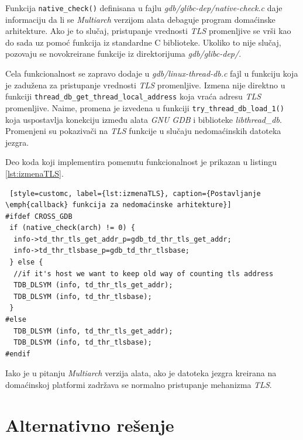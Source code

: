 \documentclass[12pt,oneside]{memoir}
\begin{document}
Funkcija \texttt{native\_check()} definisana u fajlu \emph{gdb/glibc-dep/native-check.c} daje informaciju da li se \emph{Multiarch} verzijom alata debaguje program domaćinske arhitekture. Ako je to slučaj, pristupanje vrednosti \emph{TLS} promenljive se vrši kao do sada uz pomoć funkcija iz standardne C biblioteke. Ukoliko to nije slučaj, pozovaju se novokreirane funkcije iz direktorijuma \emph{gdb/glibc-dep/}.

Cela funkcionalnost se zapravo dodaje u \emph{gdb/linux-thread-db.c} fajl u funkciju koja je zadužena za pristupanje vrednosti \emph{TLS} promenljive. Izmena nije direktno u funkciji \texttt{thread\_db\_get\_thread\_local\_address} koja vraća adresu \emph{TLS} promenljive. Naime, promena je izvedena u funkciji \texttt{try\_thread\_db\_load\_1()} koja uspostavlja konekciju između alata \emph{GNU GDB} i biblioteke \emph{libthread\_db}. Promenjeni su pokazivači na \emph{TLS} funkcije u slučaju nedomaćinskih datoteka jezgra.

Deo koda koji implementira pomenutu funkcionalnost je prikazan u listingu \ref{lst:izmenaTLS}.
\begin{lstlisting} [style=customc, label={lst:izmenaTLS}, caption={Postavljanje \emph{callback} funkcija za nedomaćinske arhitekture}]
#ifdef CROSS_GDB
 if (native_check(arch) != 0) {
  info->td_thr_tls_get_addr_p=gdb_td_thr_tls_get_addr;
  info->td_thr_tlsbase_p=gdb_td_thr_tlsbase;
 } else {
  //if it's host we want to keep old way of counting tls address
  TDB_DLSYM (info, td_thr_tls_get_addr);
  TDB_DLSYM (info, td_thr_tlsbase);
 }
#else
  TDB_DLSYM (info, td_thr_tls_get_addr);
  TDB_DLSYM (info, td_thr_tlsbase);
#endif
\end{lstlisting}
Iako je u pitanju \emph{Multiarch} verzija alata, ako je datoteka jezgra kreirana na domaćinskoj platformi zadržava se normalno pristupanje mehanizma \emph{TLS}.

\section{Alternativno rešenje}
\end{document}
